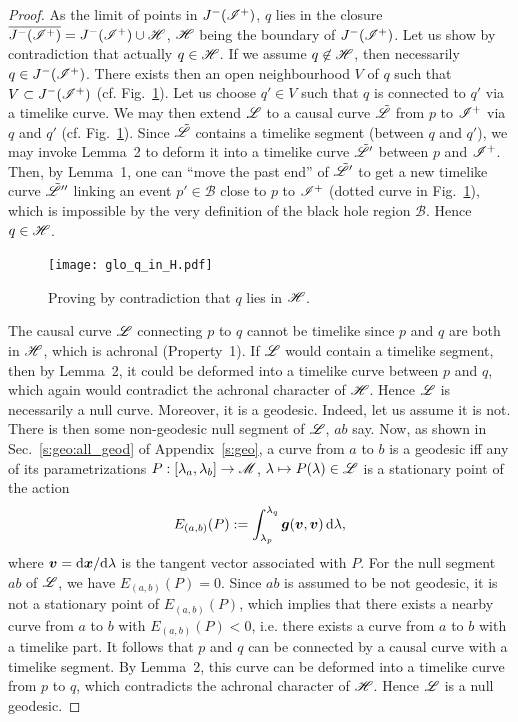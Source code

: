 \begin{proof}
As the limit of points in $J^-(\mathscr{I}^+)$, $q$ lies in the closure
$\overline{J^-(\mathscr{I}^+)} = J^-(\mathscr{I}^+) \cup \mathscr{H}$, $\mathscr{H}$
being the boundary of $J^-(\mathscr{I}^+)$.
Let us show by contradiction that actually $q\in\mathscr{H}$.
If we assume $q\not\in\mathscr{H}$, then necessarily $q\in J^-(\mathscr{I}^+)$.
There exists then an open neighbourhood $V$ of $q$ such that $V \subset  J^-(\mathscr{I}^+)$
(cf. Fig.~\ref{f:glo:q_in_H}).
Let us choose $q'\in V$ such that $q$ is connected to $q'$ via a timelike curve.
We may then extend $\mathscr{L}$ to a causal curve $\tilde{\mathscr{L}}$ from $p$ to $\mathscr{I}^+$
via $q$ and $q'$ (cf. Fig.~\ref{f:glo:q_in_H}). Since $\tilde{\mathscr{L}}$ contains a timelike segment
(between $q$ and $q'$), we may invoke Lemma~2 to deform it into
a timelike curve $\tilde{\mathscr{L}}'$ between $p$ and $\mathscr{I}^+$. Then, by Lemma~1,
one can ``move the past end'' of $\tilde{\mathscr{L}}'$
to get a new timelike curve $\tilde{\mathscr{L}}''$ linking an event $p'\in\mathscr{B}$ close
to $p$ to $\mathscr{I}^+$ (dotted curve in Fig.~\ref{f:glo:q_in_H}), which is impossible by the very definition of the black hole
region $\mathscr{B}$. Hence $q\in\mathscr{H}$.

\begin{figure}
\centerline{\texttt{[image: glo\_q\_in\_H.pdf]}}
\caption[]{\label{f:glo:q_in_H} \footnotesize
Proving by contradiction that $q$ lies in $\mathscr{H}$.}
\end{figure}


The causal curve $\mathscr{L}$ connecting $p$ to $q$ cannot be timelike since
$p$ and $q$ are both in $\mathscr{H}$, which is achronal (Property~1).
If $\mathscr{L}$ would contain a timelike segment, then by Lemma~2, it could
be deformed into a timelike curve between $p$ and $q$, which again would
contradict the achronal character of $\mathscr{H}$. Hence $\mathscr{L}$ is necessarily a null
curve. Moreover, it is a geodesic. Indeed, let us assume it is not.
There is then some non-geodesic null segment of $\mathscr{L}$, $ab$ say. Now, as shown in Sec.~\ref{s:geo:all_geod} of Appendix~\ref{s:geo},
a curve from $a$ to $b$ is a geodesic iff any of its parametrizations
$P: [\lambda_a,\lambda_b] \rightarrow \mathscr{M}$, $\lambda \mapsto P(\lambda)\in\mathscr{L}$
is a stationary point of the action
\[
    E_{(a,b)}(P) := \int_{\lambda_p}^{\lambda_q}
        \bm{g}(\bm{v}, \bm{v})  \, \mathrm{d}\lambda ,
\]
where $\bm{v} = \mathrm{d}\bm{x}/\mathrm{d}\lambda$ is the tangent vector
associated with $P$. For the null segment $ab$ of $\mathscr{L}$, we have
$E_{(a,b)}(P)=0$. Since $ab$ is assumed to be not geodesic, it is not a
stationary point of $E_{(a,b)}(P)$, which
implies that there exists a nearby curve from $a$ to $b$ with $E_{(a,b)}(P)<0$,
i.e. there exists a curve from $a$ to $b$ with a timelike part.
It follows that $p$ and $q$ can be connected
by a causal curve with a timelike segment. By Lemma~2, this curve can be
deformed into a timelike curve from $p$ to $q$, which contradicts
the achronal character of $\mathscr{H}$. Hence $\mathscr{L}$ is a null geodesic.


\end{proof}
